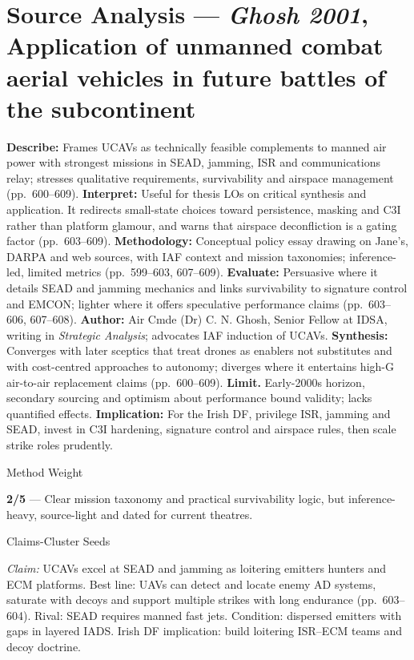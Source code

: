 \section*{Source Analysis — \textit{Ghosh 2001}, Application of unmanned combat aerial vehicles in future battles of the subcontinent}
\textbf{Describe:} Frames UCAVs as technically feasible complements to manned air power with strongest missions in SEAD, jamming, ISR and communications relay; stresses qualitative requirements, survivability and airspace management (pp.~600–609).
\textbf{Interpret:} Useful for thesis LOs on critical synthesis and application. It redirects small-state choices toward persistence, masking and C3I rather than platform glamour, and warns that airspace deconfliction is a gating factor (pp.~603–609).
\textbf{Methodology:} Conceptual policy essay drawing on Jane’s, DARPA and web sources, with IAF context and mission taxonomies; inference-led, limited metrics (pp.~599–603, 607–609).
\textbf{Evaluate:} Persuasive where it details SEAD and jamming mechanics and links survivability to signature control and EMCON; lighter where it offers speculative performance claims (pp.~603–606, 607–608).
\textbf{Author:} Air Cmde (Dr) C. N. Ghosh, Senior Fellow at IDSA, writing in \textit{Strategic Analysis}; advocates IAF induction of UCAVs.
\textbf{Synthesis:} Converges with later sceptics that treat drones as enablers not substitutes and with cost-centred approaches to autonomy; diverges where it entertains high-G air-to-air replacement claims (pp.~600–609).
\textbf{Limit.} Early-2000s horizon, secondary sourcing and optimism about performance bound validity; lacks quantified effects.
\textbf{Implication:} For the Irish DF, privilege ISR, jamming and SEAD, invest in C3I hardening, signature control and airspace rules, then scale strike roles prudently.

Method Weight

\textbf{2/5} — Clear mission taxonomy and practical survivability logic, but inference-heavy, source-light and dated for current theatres.

Claims-Cluster Seeds

\textit{Claim:} UCAVs excel at SEAD and jamming as loitering emitters hunters and ECM platforms.
Best line: UAVs can detect and locate enemy AD systems, saturate with decoys and support multiple strikes with long endurance (pp.~603–604). Rival: SEAD requires manned fast jets. Condition: dispersed emitters with gaps in layered IADS. Irish DF implication: build loitering ISR–ECM teams and decoy doctrine.

